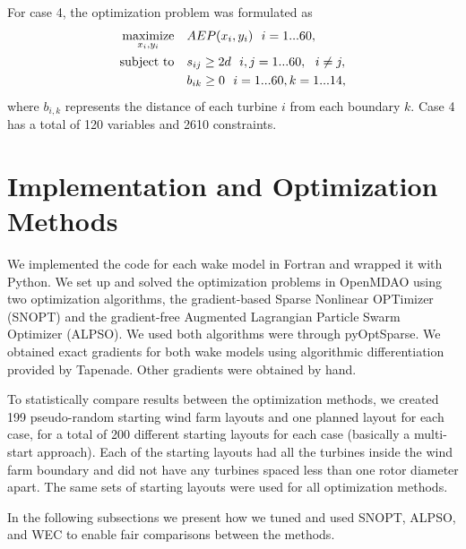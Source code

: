 \documentclass[hidelinks,sort&compress,AMA,STIX1COL]{WileyNJD-v2}
\begin{document}
%
For case 4, the optimization problem was formulated as
%
\begin{equation}
\label{eqn:opt3}
\begin{aligned} [b]
\underset{x_i,y_i}{\textrm{maximize}} \quad & AEP(x_i,y_i)~~i=1...60,\\
\textrm{subject to} \quad & s_{ij} \geq 2\*d~~i,j=1...60,~~i \neq j,\\
& b_{ik} \geq 0 ~~ i=1...60, k=1...14,
\end{aligned}
\end{equation}
%
where $b_{i,k}$ represents the distance of each turbine $i$ from each boundary $k$. Case 4 has a total of 120 variables and 2610 constraints.

\section{Implementation and Optimization Methods}\label{sec:tuning}

We implemented the code for each wake model in Fortran and wrapped it with Python. We set up and solved the optimization problems in OpenMDAO\cite{gray2010_OpenMDAO} using two optimization algorithms, the gradient-based Sparse Nonlinear OPTimizer (SNOPT)\cite{gill2005} and the gradient-free Augmented Lagrangian Particle Swarm Optimizer (ALPSO)\cite{jansen2011_alpso}. We used both algorithms were through pyOptSparse\cite{perez2012a}. We obtained exact gradients for both wake models using algorithmic differentiation provided by Tapenade\cite{tapenade2013}. Other gradients were obtained by hand. 

To statistically compare results between the optimization methods, we created 199 pseudo-random starting wind farm layouts and one planned layout for each case, for a total of 200 different starting layouts for each case (basically a multi-start approach). Each of the starting layouts had all the turbines inside the wind farm boundary and did not have any turbines spaced less than one rotor diameter apart. The same sets of starting layouts were used for all optimization methods.  

In the following subsections we present how we tuned and used SNOPT, ALPSO, and WEC to enable fair comparisons between the methods.
\end{document}
